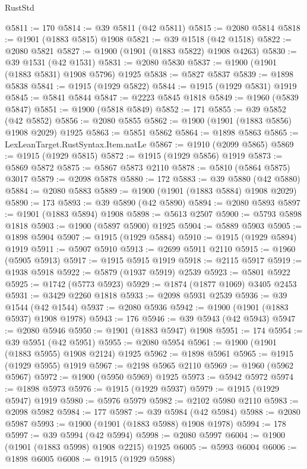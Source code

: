 \begin{lexlean}{RustStd}
\begin{coremodule}
{\begin{coremodule}
{{{{{{{{{{{{{{{{{{{{{{{{{{{{{{{{{{{{{{{{{{{@5811 := 170
@5814 := @39 @5811 (@42 @5811)
@5815 := @2080 @5814
@5818 := @1901 (@1883 @5815) @1908
@5821 := @39 @1518 (@42 @1518)
@5822 := @2080 @5821
@5827 := @1900 (@1901 (@1883 @5822) @1908 @4263)
@5830 := @39 @1531 (@42 @1531)
@5831 := @2080 @5830
@5837 := @1900 (@1901 (@1883 @5831) @1908 @5796) @1925
@5838 := @5827 @5837
@5839 := @1898 @5838
@5841 := @1915 (@1929 @5822)
@5844 := @1915 (@1929 @5831) @1919
@5845 := @5841 @5844
@5847 := @2223 @5845 @1818
@5849 := @1960 (@5839 @5847)
@5851 := @1900 (@5818 @5849)
@5852 := 171
@5855 := @39 @5852 (@42 @5852)
@5856 := @2080 @5855
@5862 := @1900 (@1901 (@1883 @5856) @1908 @2029) @1925
@5863 := @5851 @5862
@5864 := @1898 @5863
@5865 := LexLeanTarget.RustSyntax.Item.natLe
@5867 := @1910 (@2099 @5865)
@5869 := @1915 (@1929 @5815)
@5872 := @1915 (@1929 @5856) @1919
@5873 := @5869 @5872
@5875 := @5867 @5873 @2110
@5878 := @5810 (@5864 @5875) @3017
@5879 := @2098 @5878
@5880 := 172
@5883 := @39 @5880 (@42 @5880)
@5884 := @2080 @5883
@5889 := @1900 (@1901 (@1883 @5884) @1908 @2029)
@5890 := 173
@5893 := @39 @5890 (@42 @5890)
@5894 := @2080 @5893
@5897 := @1901 (@1883 @5894) @1908
@5898 := @5613 @2507
@5900 := @5793 @5898 @1818
@5903 := @1900 (@5897 @5900) @1925
@5904 := @5889 @5903
@5905 := @1898 @5904
@5907 := @1915 (@1929 @5884)
@5910 := @1915 (@1929 @5894) @1919
@5911 := @5907 @5910
@5913 := @2699 @5911 @2110
@5915 := @1960 (@5905 @5913)
@5917 := @1915 @5915 @1919
@5918 := @2115 @5917
@5919 := @1938 @5918
@5922 := @5879 (@1937 @5919) @2539
@5923 := @5801 @5922
@5925 := @1742 (@5773 @5923)
@5929 := @1874 (@1877 @1069) @3405 @2453
@5931 := @3429 @2260 @1818
@5933 := @2098 @5931 @2539
@5936 := @39 @1544 (@42 @1544)
@5937 := @2080 @5936
@5942 := @1900 (@1901 (@1883 @5937) @1908 @1978)
@5943 := 176
@5946 := @39 @5943 (@42 @5943)
@5947 := @2080 @5946
@5950 := @1901 (@1883 @5947) @1908
@5951 := 174
@5954 := @39 @5951 (@42 @5951)
@5955 := @2080 @5954
@5961 := @1900 (@1901 (@1883 @5955) @1908 @2124) @1925
@5962 := @1898 @5961
@5965 := @1915 (@1929 @5955) @1919
@5967 := @2198 @5965 @2110
@5969 := @1960 (@5962 @5967)
@5972 := @1900 (@5950 @5969) @1925
@5973 := @5942 @5972
@5974 := @1898 @5973
@5976 := @1915 (@1929 @5937)
@5979 := @1915 (@1929 @5947) @1919
@5980 := @5976 @5979
@5982 := @2102 @5980 @2110
@5983 := @2098 @5982
@5984 := 177
@5987 := @39 @5984 (@42 @5984)
@5988 := @2080 @5987
@5993 := @1900 (@1901 (@1883 @5988) @1908 @1978)
@5994 := 178
@5997 := @39 @5994 (@42 @5994)
@5998 := @2080 @5997
@6004 := @1900 (@1901 (@1883 @5998) @1908 @2215) @1925
@6005 := @5993 @6004
@6006 := @1898 @6005
@6008 := @1915 (@1929 @5988)
}}}}}}}}}}}}}}}}}}}}}}}}}}}}}}}}}}}}}}}}}}}
\end{coremodule}}
\end{coremodule}
\end{lexlean}
